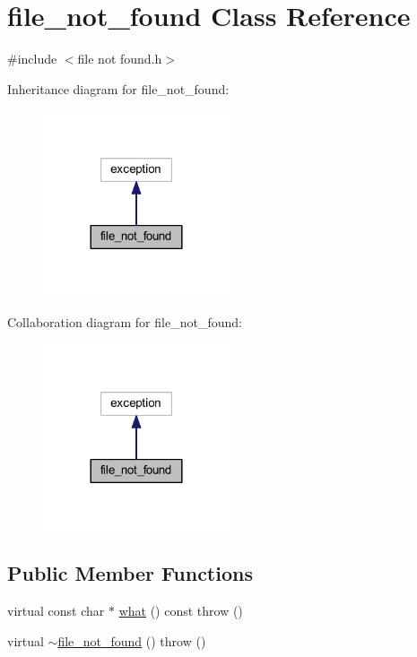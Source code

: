 \hypertarget{classfile__not__found}{}\section{file\+\_\+not\+\_\+found Class Reference}
\label{classfile__not__found}


{\ttfamily \#include $<$file not found.\+h$>$}



Inheritance diagram for file\+\_\+not\+\_\+found\+:\nopagebreak
\begin{figure}[H]
\begin{center}
\leavevmode
\includegraphics[width=156pt]{classfile__not__found__inherit__graph}
\end{center}
\end{figure}


Collaboration diagram for file\+\_\+not\+\_\+found\+:\nopagebreak
\begin{figure}[H]
\begin{center}
\leavevmode
\includegraphics[width=156pt]{classfile__not__found__coll__graph}
\end{center}
\end{figure}
\subsection*{Public Member Functions}
\begin{DoxyCompactItemize}
\item 
virtual const char $\ast$ \hyperlink{classfile__not__found_a082aafca4de0a7ea87aa45dc2a85cddf}{what} () const   throw ()
\item 
virtual \hyperlink{classfile__not__found_a533bcc14073a910ec2193c31357c96a9}{$\sim$file\+\_\+not\+\_\+found} ()  throw ()
\end{DoxyCompactItemize}


